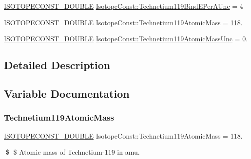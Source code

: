 \begin{DoxyCompactItemize}
\mbox{\hyperlink{group___isotope_const-_macros_ga8f45a7272ce02c0b4c65c44636ed719a}{I\+S\+O\+T\+O\+P\+E\+C\+O\+N\+S\+T\+\_\+\+D\+O\+U\+B\+LE}} \mbox{\hyperlink{group___isotope_const-_technetium-_tc119_ga1fdbe432ab150d3185a134b035e23a64}{Isotope\+Const\+::\+Technetium119\+Bind\+E\+Per\+A\+Unc}} = 4
\item 
\mbox{\hyperlink{group___isotope_const-_macros_ga8f45a7272ce02c0b4c65c44636ed719a}{I\+S\+O\+T\+O\+P\+E\+C\+O\+N\+S\+T\+\_\+\+D\+O\+U\+B\+LE}} \mbox{\hyperlink{group___isotope_const-_technetium-_tc119_ga67a9ffeae79a90ebe2f2c22ce82dbb3d}{Isotope\+Const\+::\+Technetium119\+Atomic\+Mass}} = 118.
\item 
\mbox{\hyperlink{group___isotope_const-_macros_ga8f45a7272ce02c0b4c65c44636ed719a}{I\+S\+O\+T\+O\+P\+E\+C\+O\+N\+S\+T\+\_\+\+D\+O\+U\+B\+LE}} \mbox{\hyperlink{group___isotope_const-_technetium-_tc119_gadfd144d367997b2acd3439f36af8d08d}{Isotope\+Const\+::\+Technetium119\+Atomic\+Mass\+Unc}} = 0.
\end{DoxyCompactItemize}


\subsection{Detailed Description}


\subsection{Variable Documentation}
\mbox{\label{group___isotope_const-_technetium-_tc119_ga67a9ffeae79a90ebe2f2c22ce82dbb3d}} 
\subsubsection{\texorpdfstring{Technetium119\+Atomic\+Mass}{Technetium119AtomicMass}}
{\footnotesize\ttfamily \mbox{\hyperlink{group___isotope_const-_macros_ga8f45a7272ce02c0b4c65c44636ed719a}{I\+S\+O\+T\+O\+P\+E\+C\+O\+N\+S\+T\+\_\+\+D\+O\+U\+B\+LE}} Isotope\+Const\+::\+Technetium119\+Atomic\+Mass = 118.}

\$ \$ Atomic mass of Technetium-\/119 in amu. \mbox{\label{group___isotope_const-_technetium-_tc119_gadfd144d367997b2acd3439f36af8d08d}} 
